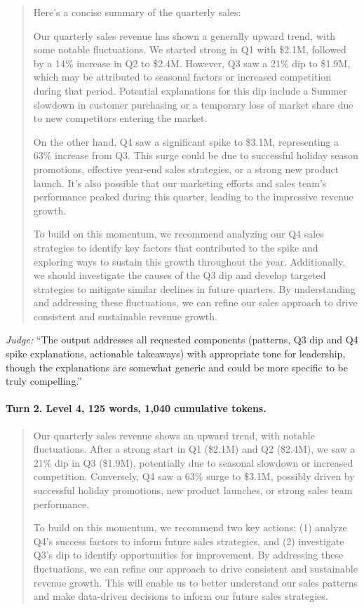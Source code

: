 \begin{quote}\small
Here's a concise summary of the quarterly sales:

Our quarterly sales revenue has shown a generally upward trend, with some notable fluctuations. We started strong in Q1 with \$2.1M, followed by a 14\% increase in Q2 to \$2.4M. However, Q3 saw a 21\% dip to \$1.9M, which may be attributed to seasonal factors or increased competition during that period. Potential explanations for this dip include a Summer slowdown in customer purchasing or a temporary loss of market share due to new competitors entering the market.

On the other hand, Q4 saw a significant spike to \$3.1M, representing a 63\% increase from Q3. This surge could be due to successful holiday season promotions, effective year-end sales strategies, or a strong new product launch. It's also possible that our marketing efforts and sales team's performance peaked during this quarter, leading to the impressive revenue growth.

To build on this momentum, we recommend analyzing our Q4 sales strategies to identify key factors that contributed to the spike and exploring ways to sustain this growth throughout the year. Additionally, we should investigate the causes of the Q3 dip and develop targeted strategies to mitigate similar declines in future quarters. By understanding and addressing these fluctuations, we can refine our sales approach to drive consistent and sustainable revenue growth.
\end{quote}

\noindent\textit{Judge:} ``The output addresses all requested components (patterns, Q3 dip and Q4 spike explanations, actionable takeaways) with appropriate tone for leadership, though the explanations are somewhat generic and could be more specific to be truly compelling.''

\paragraph{Turn 2. Level 4, 125 words, 1,040 cumulative tokens.}

\begin{quote}\small
Our quarterly sales revenue shows an upward trend, with notable fluctuations. After a strong start in Q1 (\$2.1M) and Q2 (\$2.4M), we saw a 21\% dip in Q3 (\$1.9M), potentially due to seasonal slowdown or increased competition. Conversely, Q4 saw a 63\% surge to \$3.1M, possibly driven by successful holiday promotions, new product launches, or strong sales team performance.

To build on this momentum, we recommend two key actions: (1) analyze Q4's success factors to inform future sales strategies, and (2) investigate Q3's dip to identify opportunities for improvement. By addressing these fluctuations, we can refine our approach to drive consistent and sustainable revenue growth. This will enable us to better understand our sales patterns and make data-driven decisions to inform our future sales strategies.
\end{quote}

